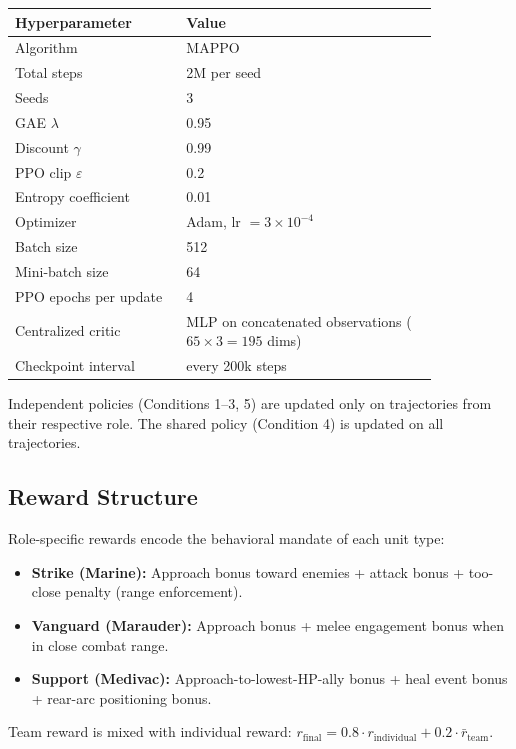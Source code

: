 \begin{center}
\small
\begin{tabular}{p{0.34\linewidth}p{0.5\linewidth}}
\toprule
Hyperparameter & Value \\
\midrule
Algorithm & MAPPO \\
Total steps & 2M per seed \\
Seeds & 3 \\
GAE $\lambda$ & 0.95 \\
Discount $\gamma$ & 0.99 \\
PPO clip $\varepsilon$ & 0.2 \\
Entropy coefficient & 0.01 \\
Optimizer & Adam, lr $= 3 \times 10^{-4}$ \\
Batch size & 512 \\
Mini-batch size & 64 \\
PPO epochs per update & 4 \\
Centralized critic & MLP on concatenated observations ($65 \times 3 = 195$ dims) \\
Checkpoint interval & every 200k steps \\
\bottomrule
\end{tabular}
\end{center}

Independent policies (Conditions 1--3, 5) are updated only on trajectories from their respective role. The shared policy (Condition 4) is updated on all trajectories.

\subsection{Reward Structure}

Role-specific rewards encode the behavioral mandate of each unit type:
\begin{itemize}
  \item \textbf{Strike (Marine):} Approach bonus toward enemies + attack bonus + too-close penalty (range enforcement).
  \item \textbf{Vanguard (Marauder):} Approach bonus + melee engagement bonus when in close combat range.
  \item \textbf{Support (Medivac):} Approach-to-lowest-HP-ally bonus + heal event bonus + rear-arc positioning bonus.
\end{itemize}
Team reward is mixed with individual reward: $r_{\text{final}} = 0.8 \cdot r_{\text{individual}} + 0.2 \cdot \bar{r}_{\text{team}}$.
